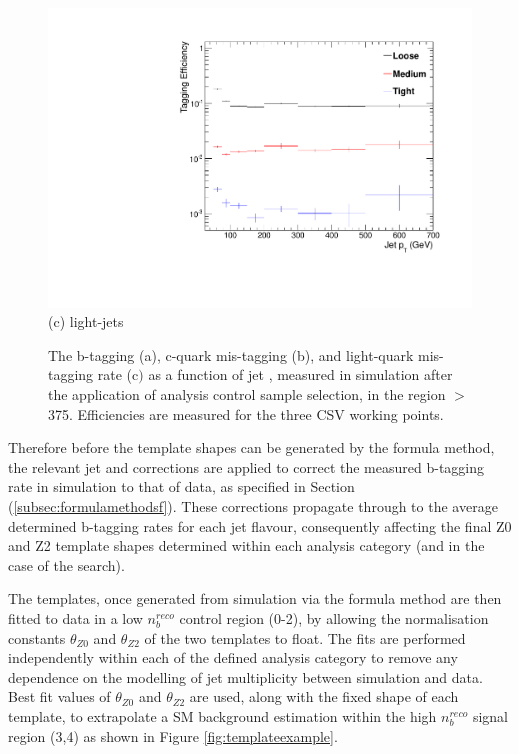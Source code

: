 \begin{figure}[ht]
\begin{minipage}[b]{0.48\linewidth}
\centering
\includegraphics[width = 1.0\linewidth]{plots/lighjet_PtDistribution_Htbin_Template_375.pdf}
\centering (c) light-jets
\end{minipage}
\caption[The b-tagging (a), c-quark mis-tagging (b), and light-quark mis-tagging rate (c$)$ as a function of jet \pt, measured in simulation after the application of the \alphat analysis \mupjets control sample selection, in the region \theht $>$ 375.]{The b-tagging (a), c-quark mis-tagging (b), and light-quark mis-tagging rate (c$)$ as a function of jet \pt, measured in simulation after the application of \alphat analysis \mupjets control sample selection, in the region \theht $>$ 375. Efficiencies are measured for the three \ac{CSV} working points.}
\label{fig:templatetaggingefficiencies}
\end{figure}
\FloatBarrier
Therefore before the template shapes can be generated by the formula method, the relevant jet \pt and \eta corrections are applied to correct the measured b-tagging rate in simulation to that of data, as specified in Section (\ref{subsec:formulamethodsf}). These corrections propagate through to the average determined b-tagging rates for each jet flavour, consequently affecting the final Z0 and Z2 \nbreco template shapes determined within each analysis category (\theht and \njet in the case of the \alphat search). 

The templates, once generated from simulation via the formula method are then fitted to data in a low $n_{b}^{reco}$ control region (0-2), by allowing the normalisation constants $\theta_{Z0}$ and $\theta_{Z2}$ of the two templates to float. The fits are performed independently within each of the defined analysis category to remove any dependence on the modelling of jet multiplicity between simulation and data. Best fit values of $\theta_{Z0}$ and $\theta_{Z2}$ are used, along with the fixed shape of each template, to extrapolate a \ac{SM} background estimation within the high $n_{b}^{reco}$ signal region (3,4) as shown in Figure \ref{fig:templateexample}. 


